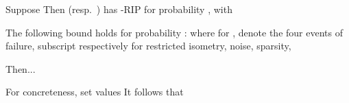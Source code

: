 {
\I Suppose
%
%
\I Then  (resp.\ ) has -RIP for probability , with
}
{
\I The following bound holds for probability :
%
\I where for , denote the four events of failure, subscript respectively for restricted isometry, noise, sparsity,

\I Then...
}
{
\I For concreteness, set values
%
\I It follows that
}


